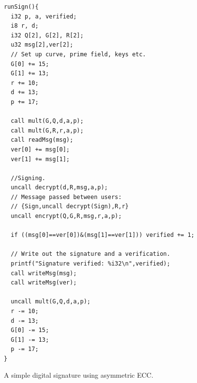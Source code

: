 \begin{figure}[H]
  \begin{Verbatim}
runSign(){
  i32 p, a, verified;     
  i8 r, d;                
  i32 Q[2], G[2], R[2];  
  u32 msg[2],ver[2];
  // Set up curve, prime field, keys etc. 
  G[0] += 15;
  G[1] += 13;
  r += 10;               
  d += 13;               
  p += 17;

  call mult(G,Q,d,a,p);   
  call mult(G,R,r,a,p);   
  call readMsg(msg);
  ver[0] += msg[0];
  ver[1] += msg[1];

  //Signing.
  uncall decrypt(d,R,msg,a,p);
  // Message passed between users:
  // {Sign,uncall decrypt(Sign),R,r}
  uncall encrypt(Q,G,R,msg,r,a,p);
  
  if ((msg[0]==ver[0])&(msg[1]==ver[1])) verified += 1;
  
  // Write out the signature and a verification.
  printf("Signature verified: %i32\n",verified);
  call writeMsg(msg);
  call writeMsg(ver);
  
  uncall mult(G,Q,d,a,p);
  r -= 10;
  d -= 13;
  G[0] -= 15;
  G[1] -= 13;  
  p -= 17;
}
  \end{Verbatim}
\caption{A simple digital signature using asymmetric ECC.}
\label{fig:ECCSign}
\end{figure}

